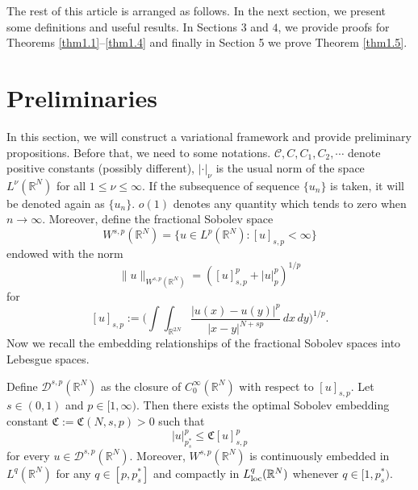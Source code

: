 \documentclass[reqno]{amsart}
\begin{document}
The rest of this article is arranged as follows. 
In the next section, we present some definitions and useful results.
 In Sections $3$ and $4$, we provide proofs for Theorems \ref{thm1.1}--\ref{thm1.4} 
and finally in Section 5 we prove Theorem \ref{thm1.5}.

\section{Preliminaries}

In this section, we will construct a variational framework and provide
preliminary propositions. Before that, we need to some notations. 
$\mathcal{C}, C, C_1, C_2, \cdots$ denote positive constants (possibly different), 
$|\cdot|_\nu$ is the usual norm of the space $L^{\nu}(\mathbb{R}^N)$ for all 
$1\leq \nu\leq \infty$. If the subsequence of sequence $\{u_n\}$ is taken, 
it will be denoted again as $\{u_n\}$. $o(1)$ denotes any quantity which tends 
to zero when $n\to  \infty$. Moreover, define the fractional Sobolev space
$$
W^{s,p}(\mathbb{R}^N)=\{u\in L^p(\mathbb{R}^N): [u]_{s,p}<\infty\}
$$
endowed with the norm
$$
\|u\|_{W^{s,p}(\mathbb{R}^N)}=([u]_{s,p}^p+|u|^p_p)^{1/p}
$$
for
$$
[u]_{s,p}:=\Big(\int\int_{\mathbb{R}^{2N}}\frac{|u(x)-u(y)|^p}{|x-y|^{N+sp}}\,dx\,dy
\Big)^{1/p}.
$$
Now we recall  the embedding relationships of the fractional Sobolev spaces 
into Lebesgue spaces.

\begin{lemma} \label{L2.1}
Define $\mathcal{D}^{s,p}(\mathbb{R}^N)$ as the closure of
$C_0^\infty(\mathbb{R}^N)$ with respect to $[u]_{s,p}$. Let $s\in(0, 1)$ and 
$p\in[1, \infty)$. Then there exists the optimal Sobolev embedding constant 
$\mathfrak{C}:=\mathfrak{C}(N, s, p)>0$ such that
$$
|u|_{p^*_s}^p\leq\mathfrak{C}[u]_{s,p}^p
$$
for every $u\in\mathcal{D}^{s,p}(\mathbb{R}^N)$. 
Moreover, $W^{s,p}(\mathbb{R}^N)$ is continuously embedded in $L^q(\mathbb{R}^N)$ 
for any $q\in[p, p^*_s]$ and compactly in $L_{\rm loc}^q(\mathbb{R}^N)$ whenever
$q\in[1, p^*_s)$.
\end{lemma}
\end{document}
